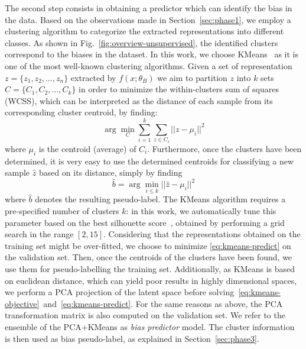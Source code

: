 The second step consists in obtaining a predictor which can identify the bias in the data. 
Based on the observations made in Section~\ref{sec:phase1}, we employ a clustering algorithm to categorize the extracted representations into different classes. As shown in Fig.~\ref{fig:overview-unsupervised}, the identified clusters correspond to the biases in the dataset.
In this work, we choose KMeans~\cite{lloyd1982least} as it is one of the most well-known clustering algorithms.
Given a set of representation $z = \{z_1, z_2,\dots, z_n\}$ extracted by $f(x; \theta_B)$ we aim to partition $z$ into $k$ sets $C = \{C_1, C_2, \dots, C_k\}$ in order to minimize the within-clusters sum of squares (WCSS), which can be interpreted as the distance of each sample from its corresponding cluster centroid, by finding: 
\begin{equation}
    \label{eq:kmeans-objective}
    \arg\!\min_C \sum_{i=1}^k \sum_{z \in C_i}|| z - \mu_i ||^2
\end{equation}
where $\mu_i$ is the centroid (average) of $C_i$.
Furthermore, once the clusters have been determined, 
it is very easy to use the determined centroids for classifying a new sample $\hat{z}$ based on its distance, simply by finding 
\begin{equation}
    \label{eq:kmeans-predict}
    \hat{b} = \arg\!\min_{i \leq k} ||\hat{z} - \mu_i||^2
\end{equation}
where $\hat{b}$ denotes the resulting pseudo-label. 
The KMeans algorithm requires a pre-specified number of clusters $k$: in this work, we automatically tune this parameter based on the
best silhouette score~\cite{rousseeuw87silhouetteCluster}, obtained by performing a grid search in the range $[2, 15]$. 
Considering that the representations obtained on the training set might be over-fitted, we choose to minimize \eqref{eq:kmeans-predict} on the validation set. Then, once the centroids of the clusters have been found, we use them for pseudo-labelling the training set.
Additionally, as KMeans is based on euclidean distance, which can yield poor results in highly dimensional spaces, we perform a PCA projection of the latent space before solving~\eqref{eq:kmeans-objective}~and~\eqref{eq:kmeans-predict}. For the same reasons as above, the PCA transformation matrix is also computed on the validation set.
We refer to the ensemble of the PCA+KMeans as \emph{bias predictor} model.
The cluster information is then used as bias pseudo-label, as explained in Section~\ref{sec:phase3}. 

